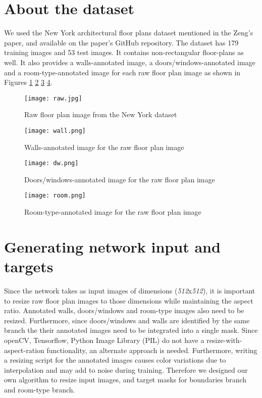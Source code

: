 \documentclass[a4paper]{article}
\begin{document}
\section{About the dataset}
We used the New York architectural floor plans dataset mentioned in the Zeng's paper, and available on the paper's GitHub repository. The dataset has 179 training images and 53 test images. It contains non-rectangular floor-plans as well. It also provides a walls-annotated image, a doors/windows-annotated image and a room-type-annotated image for each raw floor plan image as shown in Figures \ref{rawData} \ref{walls} \ref{doorsWindows} \ref{rooms}.
\begin{figure}[H]
    \centering
    \texttt{[image: raw.jpg]}
    \caption{Raw floor plan image from the New York dataset}
    \label{rawData}
\end{figure}
\begin{figure}[H]
    \centering
    \texttt{[image: wall.png]}
    \caption{Walls-annotated image for the raw floor plan image}
    \label{walls}
\end{figure}
\begin{figure}[H]
    \centering
    \texttt{[image: dw.png]}
    \caption{Doors/windows-annotated image for the raw floor plan image}
    \label{doorsWindows}
\end{figure}
\begin{figure}[H]
    \centering
    \texttt{[image: room.png]}
    \caption{Room-type-annotated image for the raw floor plan image}
    \label{rooms}
\end{figure}


\section{Generating network input and targets}
Since the network takes as input images of dimensions (\textit{512}x\textit{512}), it is important to resize raw floor plan images to those dimensions while maintaining the aspect ratio. Annotated walls, doors/windows and room-type images also need to be resized. Furthermore, since doors/windows and walls are identified by the same branch the their annotated images need to be integrated into a single mask. Since openCV, Tensorflow, Python Image Library (PIL) do not have a resize-with-aspect-ration functionality, an alternate approach is needed. Furthermore, writing a resizing script for the annotated images causes color variations due to interpolation and may add to noise during training. Therefore we designed our own algorithm to resize input images, and target masks for boundaries branch and room-type branch.
\end{document}
